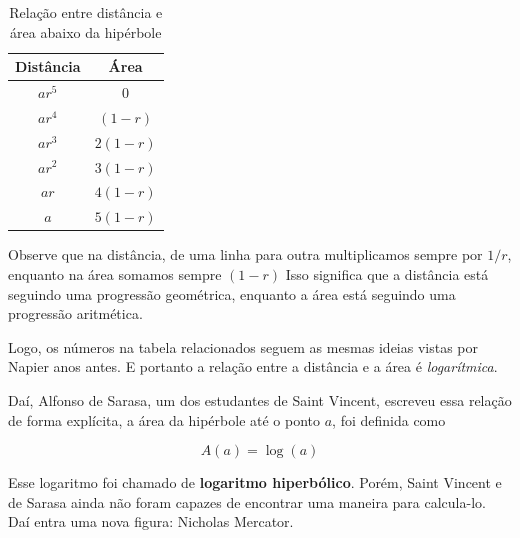 \begin{table}[h!]
\centering
\begin{tabular}{c c}
\toprule
\textbf{Distância} & \textbf{Área} \\
\midrule
$ar^5$ & $0$ \\
\addlinespace
$ar^4$ & $(1-r)$ \\
\addlinespace
$ar^3$ & $2(1-r)$ \\
\addlinespace
$ar^2$ & $3(1-r)$ \\
\addlinespace
$ar$ & $4(1-r)$ \\
\addlinespace
$a$ & $5(1-r)$ \\
\bottomrule
\end{tabular}
\caption{Relação entre distância e área abaixo da hipérbole}
\label{tab:distarea}
\end{table}

Observe que na distância, de uma linha para outra multiplicamos sempre por $1/r$, enquanto na área somamos sempre $(1-r)$  Isso significa que a distância está seguindo uma progressão geométrica, enquanto a área está seguindo uma progressão aritmética.

Logo, os números na tabela relacionados seguem as mesmas ideias vistas por Napier anos antes. E portanto a relação entre a distância e a área é \textit{logarítmica}.

Daí, Alfonso de Sarasa, um dos estudantes de Saint Vincent, escreveu essa relação de forma explícita, a área da hipérbole até o ponto $a$, foi definida como

\[
A(a) = \log(a)
\]

Esse logaritmo foi chamado de \textbf{logaritmo hiperbólico}. Porém, Saint Vincent e de Sarasa ainda não foram capazes de encontrar uma maneira para calcula-lo. Daí entra uma nova figura: Nicholas Mercator.
